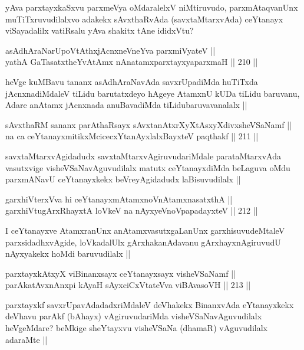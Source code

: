 \begin{artha}
yAva parxtayxkaSxvu parxmeVya oMdaralelxV niMtiruvudo, parxmAtaqvanUnx muTiTxruvudilalxvo adakekx sAvxthaRvAda (savxtaMtarxvAda) ceYtanayx viSayadalilx vatiRsalu yAva shakitx tAne ididxVtu?
\end{artha}

\begin{shl}
asAdhAraNarUpoVtAthxjAcnxneVneYva parxmiVyateV || \\
yathA GaTasatxtheYvA\s \s tAmx nAnatamxparxtayxyaparxmaH ||  210 ||  
\end{shl}

\begin{artha}
heVge kuMBavu tananx asAdhAraNavAda savxrUpadiMda huTiTxda jAcnxnadiMdaleV tiLidu barutatxdeyo hAgeye AtamxnU kUDa tiLidu baruvanu, Adare anAtamx jAcnxnada anuBavadiMda tiLidubaruvavanalalx ||
\end{artha}

\begin{shl}
sAvxthaRM sananx parAthaRsayx sAvxtanAtxrXyXtAsxyXdivxsheVSaNamf || \\
na ca ceYtanayxmitikxMcicecxYtanAyxlalxBayxteV paqthakf ||  211 ||  
\end{shl}

\begin{artha}
savxtaMtarxvAgidadudx savxtaMtarxvAgiruvudariMdale parataMtarxvAda vasutxvige visheVSaNavAguvudilalx matutx ceYtanayxdiMda beLaguva oMdu parxmANavU ceYtanayxkekx beVreyAgidadudx laBisuvudilalx ||
\end{artha}

\begin{shl}
garxhiVterxVva hi ceYtanayxmAtamxnoV\s nAtamxnasatxthA || \\
garxhiVtugArxRhayxtA loVkeV na nAyxyeVnoVpapadayxteV ||  212 ||  
\end{shl}

\begin{artha}
I ceYtanayxve AtamxranUnx anAtamxvasutxgaLanUnx garxhisuvudeMtaleV parxsidadhxvAgide, loVkadalUlx gArxhakanAdavanu gArxhayxnAgiruvudU nAyxyakekx hoMdi baruvudilalx ||
\end{artha}

\begin{shl}
parxtayxkAtxyX viBinanxsayx ceYtanayxsayx visheVSaNamf || \\
parAkatAvxnAnxpi kAyaH sAyxciCxVtateVva viBAvasoVH ||  213 ||  
\end{shl}

\begin{artha}
parxtayxkf savxrUpavAdadadxriMdaleV deVhakekx BinanxvAda eYtanayxkekx deVhavu parAkf (bAhayx) vAgiruvudariMda visheVSaNavAguvudilalx heVgeMdare? beMkige sheYtayxvu visheVSaNa (dhamaR) vAguvudilalx adaraMte ||
\end{artha}

